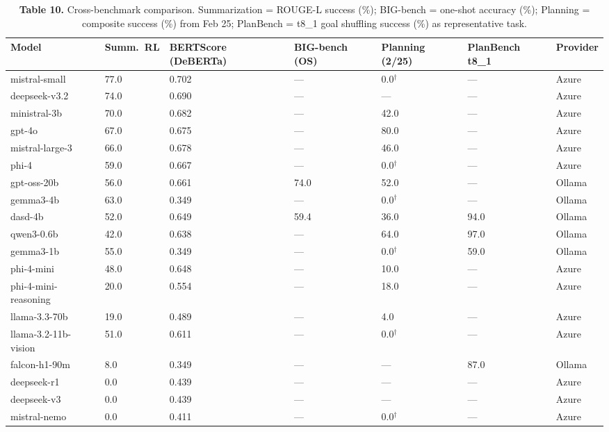 \documentclass[11pt,letterpaper]{article}
\begin{document}
\begin{table}[h!]
\centering
\caption*{\textbf{Table 10.} Cross-benchmark comparison. Summarization = ROUGE-L success (\%); BIG-bench = one-shot accuracy (\%); Planning = composite success (\%) from Feb 25; PlanBench = t8\_1 goal shuffling success (\%) as representative task.}
\begin{tabular}{l R{1.6cm} R{1.6cm} R{1.6cm} R{1.6cm} R{1.6cm} l}
\toprule
\textbf{Model} & \textbf{Summ.\ RL} & \textbf{BERTScore (DeBERTa)} & \textbf{BIG-bench (OS)} & \textbf{Planning (2/25)} & \textbf{PlanBench t8\_1} & \textbf{Provider} \\
\midrule
{} mistral-small        & 77.0 & 0.702 & --- & 0.0$^\dagger$ & --- & Azure \\
 deepseek-v3.2        & 74.0 & 0.690 & --- & --- & --- & Azure \\
 ministral-3b         & 70.0 & 0.682 & --- & 42.0 & --- & Azure \\
 gpt-4o               & 67.0 & 0.675 & --- & 80.0 & --- & Azure \\
 mistral-large-3      & 66.0 & 0.678 & --- & 46.0 & --- & Azure \\
phi-4                & 59.0 & 0.667 & --- & 0.0$^\dagger$ & --- & Azure \\
gpt-oss-20b          & 56.0 & 0.661 & 74.0 & 52.0 & --- & Ollama \\
gemma3-4b            & 63.0 & 0.349 & --- & 0.0$^\dagger$ & --- & Ollama \\
dasd-4b              & 52.0 & 0.649 & 59.4 & 36.0 & 94.0 & Ollama \\
qwen3-0.6b           & 42.0 & 0.638 & --- & 64.0 & 97.0 & Ollama \\
gemma3-1b            & 55.0 & 0.349 & --- & 0.0$^\dagger$ & 59.0 & Ollama \\
 phi-4-mini           & 48.0 & 0.648 & --- & 10.0 & --- & Azure \\
 phi-4-mini-reasoning & 20.0 & 0.554 & --- & 18.0 & --- & Azure \\
 llama-3.3-70b        & 19.0 & 0.489 & --- & 4.0 & --- & Azure \\
 llama-3.2-11b-vision & 51.0 & 0.611 & --- & 0.0$^\dagger$ & --- & Azure \\
 falcon-h1-90m        & 8.0 & 0.349 & --- & --- & 87.0 & Ollama \\
 deepseek-r1          & 0.0 & 0.439 & --- & --- & --- & Azure \\
 deepseek-v3          & 0.0 & 0.439 & --- & --- & --- & Azure \\
 mistral-nemo         & 0.0 & 0.411 & --- & 0.0$^\dagger$ & --- & Azure \\
\bottomrule
\end{tabular}


\end{table}
\end{document}
